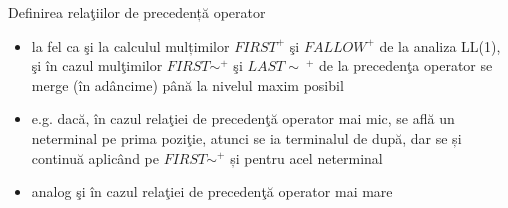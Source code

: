 \documentclass[pdf]{beamer}
\begin{document}
\begin{frame}{Definirea relaţiilor de precedență operator}
\begin{itemize}
\item
la fel ca şi la calculul mulțimilor $FIRST^+$ şi $FALLOW^+$ de la analiza LL(1), şi în cazul mulţimilor $FIRST\sim^+$ şi $LAST\sim~^+$ de la precedenţa operator se merge (în adâncime) până la nivelul maxim posibil
\item
e.g. dacă, în cazul relaţiei de precedenţă operator mai mic, se află un neterminal pe prima poziţie, atunci se ia terminalul de după, dar se și continuă aplicând pe $FIRST\sim^+$ și pentru acel neterminal
\item
analog şi în cazul relaţiei de precedenţă operator mai mare
\end{itemize}
\end{frame}
\end{document}
